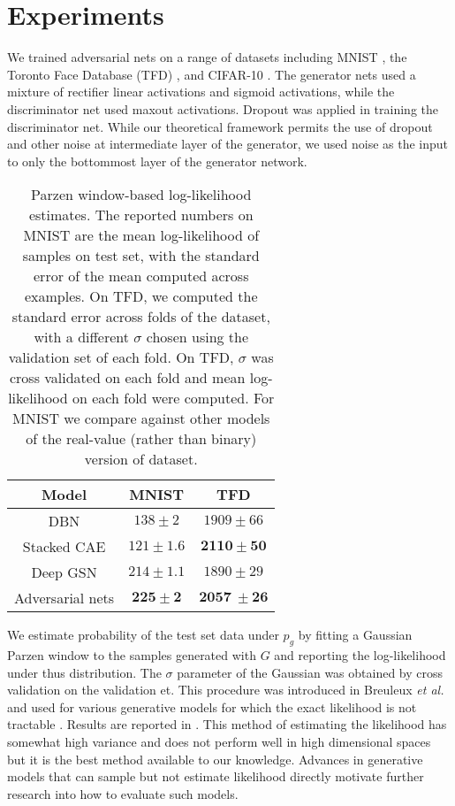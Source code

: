 \section{Experiments}

We trained adversarial nets on %
a range of datasets including MNIST \cite{23_lecun1998gradient}, the Toronto Face Database (TFD) \cite{28_susskind2010toronto}, and CIFAR-10 \cite{21_krizhevsky2009learning}. The generator nets used a mixture of rectifier linear activations \cite{19_5459469,9_pmlr-v15-glorot11a} and sigmoid activations, while the discriminator net used maxout \cite{10_goodfellow2013maxoutnetworks} activations. Dropout \cite{17_hinton2012improvingneuralnetworkspreventing} was applied in training the discriminator net. While our theoretical framework permits the use of dropout and other noise at intermediate layer of the generator, we used noise as the input to only the bottommost layer of the generator network.

\begin{table}[ht]
	\begin{tabular}{c|c|c}
		Model & MNIST & TFD\\
		\hline
		DBN \cite{3_pmlr-v28-bengio13} & $138 \pm 2$ & $1909 \pm 66$\\
		Stacked CAE \cite{3_pmlr-v28-bengio13} & $121 \pm 1.6$ & $\boldsymbol{2110 \pm 50}$\\
		Deep GSN \cite{6_pmlr-v32-bengio14} & $214 \pm 1.1$ & $1890 \pm 29$\\
		Adversarial nets & $\boldsymbol{225 \pm 2}$ & $\boldsymbol{2057\ \pm 26}$\\
	\end{tabular}
	\caption{Parzen window-based log-likelihood estimates. The reported numbers on MNIST are the mean log-likelihood of samples on test set, with the standard error of the mean computed across examples. On TFD, we computed the standard error across folds of the dataset, with a different $\sigma$ chosen using the validation set of each fold. On TFD, $\sigma$ was cross validated on each fold and mean log-likelihood on each fold were computed. For MNIST we compare against other models of the real-value (rather than binary) version of dataset.}
\end{table}

We estimate probability of the test set data under $p_g$ by fitting a Gaussian Parzen window to the samples generated with $G$ and reporting the log-likelihood under thus distribution. The $\sigma$ parameter of the Gaussian was obtained by cross validation on the validation et. This procedure was introduced in Breuleux \emph{et al.} \cite{8_6796083} and used for various generative models for which the exact likelihood is not tractable \cite{25_10.5555/3042573.3042804,3_pmlr-v28-bengio13,5_bengio2014deepgenerativestochasticnetworks}. Results are reported in %
. This method of estimating the likelihood has somewhat high variance and does not perform well in high dimensional spaces but it is the best method available to our knowledge. Advances in generative models that can sample but not estimate likelihood directly motivate further research into how to evaluate such models.

